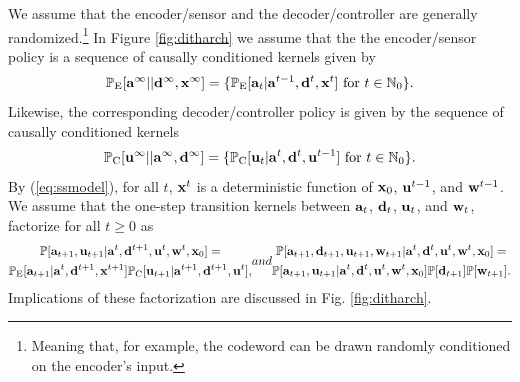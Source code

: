 \documentclass[letterpaper, 10 pt, conference]{ieeeconf}  %
\newcommand{\rvec}[1]{{\mathbf{\MakeLowercase{#1}}}}
\newcommand{\rs}[1]{\mathbf{\MakeLowercase{#1}}}
\begin{document}
We assume that the encoder/sensor and the decoder/controller are generally randomized.\footnote{Meaning that, for example, the codeword can be drawn randomly conditioned on the encoder's input.} In Figure \ref{fig:ditharch} we assume that the the encoder/sensor policy is a sequence of causally conditioned kernels given by 
\begin{align}\label{eq:encdithpol}
    \mathbb{P}_{\mathrm{E}}[\rvec{a}^{\infty}|| \rvec{d}^{\infty},\rvec{x}^{\infty}] = \{ \mathbb{P}_{\mathrm{E}}[\rvec{a}_{t}|\rvec{a}^{t-1},\rvec{d}^{t},\rvec{x}^{t}]\text{ for }t\in\mathbb{N}_{0}\}. 
\end{align} Likewise, the corresponding decoder/controller policy is given by the sequence of causally conditioned kernels 
\begin{align}\label{eq:contdithpol}
    \mathbb{P}_{\mathrm{C}}[\rvec{u}^{\infty}|| \rvec{a}^{\infty},\rvec{d}^{\infty}] = \{ \mathbb{P}_{\mathrm{C}}[\rvec{u}_{t}|\rvec{a}^{t},\rvec{d}^{t},\rvec{u}^{t-1}]\text{ for }t\in\mathbb{N}_{0}\}.
\end{align} By (\ref{eq:ssmodel}), for all $t$, $\rs{x}^{t}$ is a deterministic function of $\rvec{x}_{0}$, $\rvec{u}^{t-1}$, and $\rvec{w}^{t-1}$. We assume that the one-step transition kernels between  $\rvec{a}_{t}$, $\rvec{d}_{t}$, $\rvec{u}_{t}$, and  $\rvec{w}_{t}$, factorize for all $t\ge0$ as \begin{subequations}\label{eq:ditherFactorization}
\begin{multline}\label{eq:cwfact}
      \mathbb{P}[\rvec{a}_{t+1},\rvec{u}_{t+1}|\rvec{a}^{t},\rvec{d}^{t+1},\rvec{u}^{t},\rvec{w}^{t},\rvec{x}_{0}] =\\\mathbb{P}_{\mathrm{E}}[\rvec{a}_{t+1}|\rvec{a}^{t},\rvec{d}^{t+1},\rvec{x}^{t+1}]\mathbb{P}_{\mathrm{C}}[\rvec{u}_{t+1}|\rvec{a}^{t+1},\rvec{d}^{t+1},\rvec{u}^{t}],
\end{multline} and 
\begin{multline}\label{eq:exog}
     \mathbb{P}[\rvec{a}_{t+1},\rvec{d}_{t+1},\rvec{u}_{t+1},\rvec{w}_{t+1}|\rvec{a}^{t},\rvec{d}^{t},\rvec{u}^{t},\rvec{w}^{t},\rvec{x}_{0}] = \\\mathbb{P}[\rvec{a}_{t+1},\rvec{u}_{t+1}|\rvec{a}^{t},\rvec{d}^{t},\rvec{u}^{t},\rvec{w}^{t},\rvec{x}_{0}]\mathbb{P}[\rvec{d}_{t+1}]\mathbb{P}[\rvec{w}_{t+1}].
\end{multline}
 \end{subequations}
Implications of these factorization are discussed in Fig. \ref{fig:ditharch}. 
 
\end{document}
